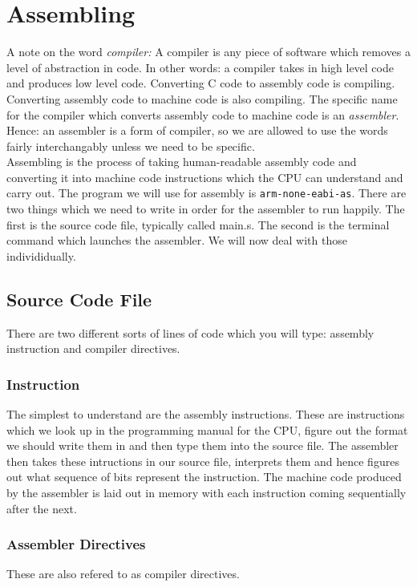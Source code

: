 \chapter{Assembling}
A note on the word \textit{compiler:} A compiler is any piece of software which removes a level of abstraction in code. In other words: a compiler takes in high level code and produces low level code. Converting C code to assembly code is compiling. Converting assembly code to machine code is also compiling. The specific name for the compiler which converts assembly code to machine code is an \emph{assembler}. Hence: an assembler is a form of compiler, so we are allowed to use the words fairly interchangably unless we need to be specific. \\
Assembling is the process of taking human-readable assembly code and converting it into machine code instructions which the CPU can understand and carry out. 
The program we will use for assembly is \texttt{arm-none-eabi-as}. 
There are two things which we need to write in order for the assembler to run happily. The first is the source code file, typically called main.s. The second is the terminal command which launches the assembler.
We will now deal with those individidually.

\section{Source Code File}
There are two different sorts of lines of code which you will type: assembly instruction and compiler directives.

\subsection{Instruction}
The simplest to understand are the assembly instructions. These are instructions which we look up in the programming manual for the CPU, figure out the format we should write them in and then type them into the source file. The assembler then takes these intructions in our source file, interprets them and hence figures out what sequence of bits represent the instruction. 
The machine code produced by the assembler is laid out in memory with each instruction coming sequentially after the next. 

\subsection{Assembler Directives}
These are also refered to as compiler directives. 

